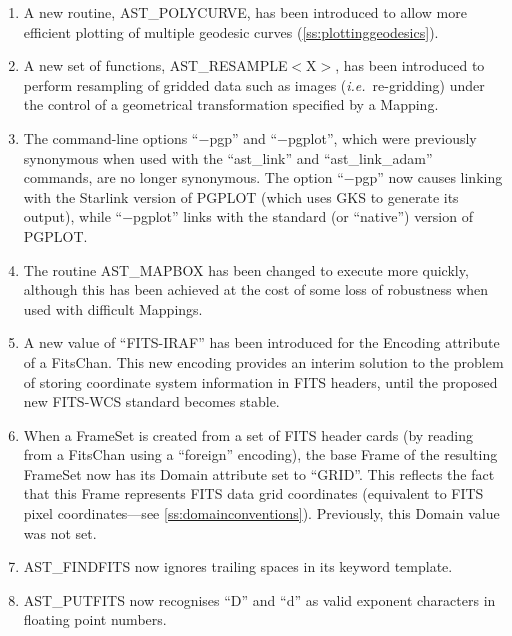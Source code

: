 \documentclass[twoside,11pt]{article}
\newcommand{\htmlref}[2]{#1}
\newcommand{\secref}[1]{\S\ref{#1}}
\renewcommand{\secref}[1]{\ref{#1}}
\begin{document}
\begin{enumerate}
\item A new routine, \htmlref{AST\_POLYCURVE}{AST_POLYCURVE}, has been introduced to allow more
efficient plotting of multiple geodesic curves
(\secref{ss:plottinggeodesics}).

\item A new set of functions, \htmlref{AST\_RESAMPLE$<$X$>$}{AST_RESAMPLEX}, has been
introduced to perform resampling of gridded data such as images
({\em{i.e.}}\ re-gridding) under the control of a geometrical
transformation specified by a \htmlref{Mapping}{Mapping}.

\item The command-line options ``$-$pgp'' and ``$-$pgplot'', which
were previously synonymous when used with the ``\htmlref{ast\_link}{ast_link}'' and
``\htmlref{ast\_link\_adam}{ast_link_adam}'' commands, are no longer synonymous. The option
``$-$pgp'' now causes linking with the Starlink version of PGPLOT
(which uses GKS to generate its output), while ``$-$pgplot'' links
with the standard (or ``native'') version of PGPLOT.

\item The routine \htmlref{AST\_MAPBOX}{AST_MAPBOX} has been changed to execute more
quickly, although this has been achieved at the cost of some loss of
robustness when used with difficult Mappings.

\item A new value of ``FITS-IRAF'' has been introduced for the
\htmlref{Encoding}{Encoding} attribute of a \htmlref{FitsChan}{FitsChan}. This new encoding provides an
interim solution to the problem of storing coordinate system
information in FITS headers, until the proposed new FITS-WCS standard
becomes stable.

\item When a \htmlref{FrameSet}{FrameSet} is created from a set of FITS header cards (by
reading from a FitsChan using a ``foreign'' encoding), the base \htmlref{Frame}{Frame}
of the resulting FrameSet now has its \htmlref{Domain}{Domain} attribute set to
``GRID''. This reflects the fact that this Frame represents FITS data
grid coordinates (equivalent to FITS pixel coordinates---see
\secref{ss:domainconventions}). Previously, this Domain value was not
set.

\item \htmlref{AST\_FINDFITS}{AST_FINDFITS} now ignores trailing spaces in its keyword template.

\item \htmlref{AST\_PUTFITS}{AST_PUTFITS} now recognises ``D'' and ``d'' as valid exponent
characters in floating point numbers.


\end{enumerate}
\end{document}
